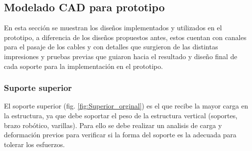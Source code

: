 \subsection{Modelado CAD para prototipo}
En esta sección se muestran los diseños implementados y utilizados en el prototipo, a diferencia de los diseños propuestos antes, estos cuentan con canales para el pasaje de los cables y con detalles que surgieron de las distintas impresiones y pruebas previas que guiaron hacia el resultado y diseño final de cada soporte para la implementación en el prototipo.
\subsubsection{Suporte superior}
El soporte superior (fig. \ref{fig:Superior_orginal}) es el que recibe la mayor carga en la estructura, ya que debe soportar el peso de la estructura vertical (soportes, brazo robótico, varillas). Para ello se debe realizar un analisis de carga y deformación previos para verificar si la forma del soporte es la adecuada para tolerar los esfuerzos.
